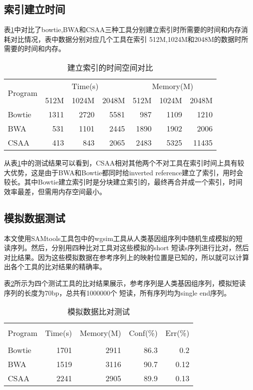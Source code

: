 \subsection{索引建立时间}
表\ref{tab:tab1}中对比了bowtie,BWA和CSAA三种工具分别建立索引时所需要的时间和内存消耗对比情况，表中数据分别对应几个工具在索引
512M,1024M和2048M的数据时所需要的时间和内存。

\begin{table}[htbp]
    \caption{建立索引的时间空间对比}
    \label{tab:tab1}
    \centering
    \begin{tabular}{lrrrrrr}
        \hline
        \multirow{2}{*}{Program} & \multicolumn{3}{c}{Time(s)} & \multicolumn{3}{c}{Memory(M)}\\
        \cline{2-4}
        \cline{5-7}
        & 512M &1024M &2048M &512M &1024M &2048M\\
        \hline
        Bowtie&1311 &2720 &5581 &987 &1109 &1210 \\
        BWA&531 &1101 &2445 &1890 &1902 &2006 \\
        CSAA&413 &843 &2065 &2483 &5325 &11435 \\
        \hline
    \end{tabular}
\end{table}

从表\ref{tab:tab1}中的测试结果可以看到，CSAA相对其他两个不对工具在索引时间上具有较大优势，这是由于BWA和Bowtie都同时给inverted
reference建立了索引，用时会较长。其中Bowtie建立索引时是分块建立索引的，最终再合并成一个索引，时间效率最差，但需用内存空间最小。

\subsection{模拟数据测试}
本文使用SAMtools工具包中的wgsim工具从人类基因组序列中随机生成模拟的短读序列。然后，分别用四种比对工具对这些模拟的short
短读s序列进行比对，然后对比结果。因为这些模拟数据在参考序列上的映射位置是已知的，所以就可以计算出各个工具的比对结果的精确率。

表\ref{tab:tab2}所示为四个测试工具的比对结果展示，参考序列是人类基因组序列，模拟短读序列的长度为70bp，总共有1000000个
短读，所有序列均为single end序列。
\begin{table}[htbp]
    \caption{模拟数据比对测试}
    \label{tab:tab2}
    \centering
    \begin{tabular}{lrrrr}
       \hline \\
       Program&Time(s)&Memory(M)&Conf(\%)&Err(\%)\\
       \hline \\
       Bowtie&1701&2911&86.3&0.2\\
       BWA&1519&3116&90.7&0.12\\
       CSAA&2241&2905&89.9&0.13\\
       \hline
    \end{tabular}
\end{table}

